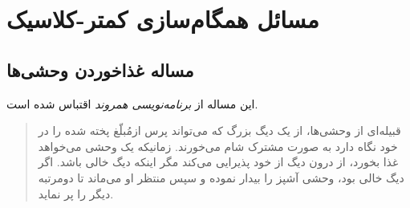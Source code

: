 \documentclass{book}
\newcommand{\clearemptydoublepage}{\newpage\cleardoublepage}
\begin{document}
\clearemptydoublepage
\chapter{مسائل همگام‌سازی کمتر-کلاسیک}
\label{next}


\section{مساله غذاخوردن وحشی‌ها}

    این مساله از  \emph{برنامه‌نویسی همروند}   اقتباس شده است\cite{andrews}. 

\begin {quotation}
    قبیله‌ای از وحشی‌ها، از یک دیگ بزرگ که می‌تواند   پرس ازمُبلّغ پخته شده را در خود نگاه دارد به صورت مشترک شام می‌خورند.
    زمانیکه یک وحشی می‌خواهد غذا بخورد، از درون دیگ از خود پذیرایی می‌کند مگر اینکه دیگ خالی باشد. 
    اگر دیگ خالی بود، وحشی آشپز را بیدار نموده و سپس منتظر او می‌ماند تا دومرتبه دیگر را پر نماید.
\end{quotation}
\end{document}
